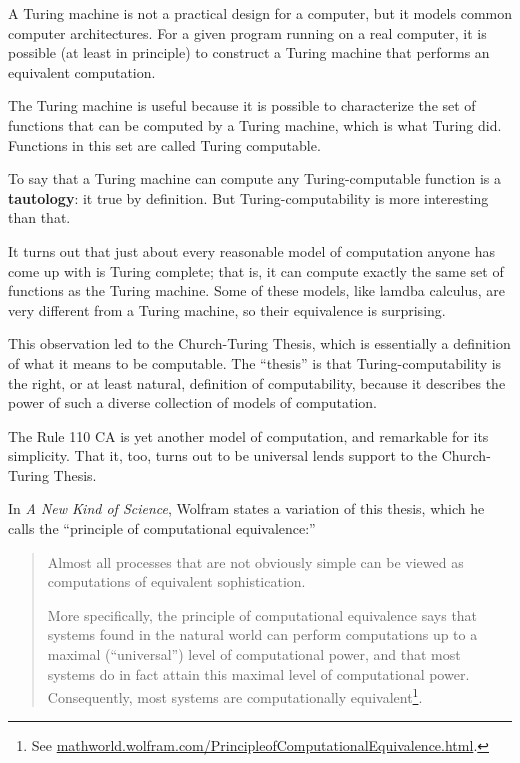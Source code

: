 \documentclass[10pt]{book}
\begin{document}
A Turing machine is not a practical design for a computer, but it
models common computer architectures.  For a given program running on
a real computer, it is possible (at least in principle) to construct a
Turing machine that performs an equivalent computation.

The Turing machine is useful because it is possible to characterize
the set of functions that can be computed by a Turing machine,
which is what Turing did.  Functions in this set are
called Turing computable.

To say that a Turing machine can compute any Turing-computable
function is a {\bf tautology}: it true by definition.  But
Turing-computability is more interesting than that.

It turns out that just about every reasonable model of computation
anyone has come up with is Turing complete; that is, it can compute
exactly the same set of functions as the Turing machine.
Some of these models, like lamdba calculus, are very different
from a Turing machine, so their equivalence is surprising.

This observation led to the Church-Turing Thesis, which is essentially
a definition of what it means to be computable.  The ``thesis'' is
that Turing-computability is the right, or at least natural,
definition of computability, because it describes the power of such a
diverse collection of models of computation.

The Rule 110 CA is yet another model of computation, and remarkable
for its simplicity.  That it, too, turns out to be universal lends
support to the Church-Turing Thesis.

In {\em A New Kind of Science}, Wolfram states a variation of this
thesis, which he calls the ``principle of computational equivalence:''

\begin{quote}
Almost all processes that are not obviously simple can be viewed as
computations of equivalent sophistication.

More specifically, the principle of computational equivalence says
that systems found in the natural world can perform computations up to
a maximal (``universal'') level of computational power, and that most
systems do in fact attain this maximal level of computational
power. Consequently, most systems are computationally
equivalent\footnote{See
  \url{mathworld.wolfram.com/PrincipleofComputationalEquivalence.html}.}.
\end{quote}
\end{document}
